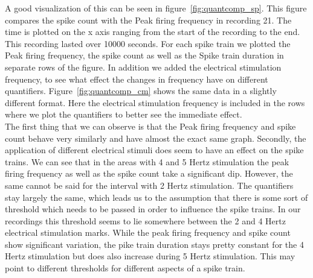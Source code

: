 A good visualization of this can be seen in figure~\ref{fig:quantcomp_sp}. This figure compares the spike count with the Peak firing frequency in recording 21. The time is plotted on the x axis ranging from the start of the recording to the end. This recording lasted over 10000 seconds. For each spike train we plotted the Peak firing frequency, the spike count as well as the Spike train duration in separate rows of the figure. In addition we added the electrical stimulation frequency, to see what effect the changes in frequency have on different quantifiers. Figure~\ref{fig:quantcomp_cm} shows the same data in a slightly different format. Here the electrical stimulation frequency is included in the rows where we plot the quantifiers to better see the immediate effect.\\
The first thing that we can observe is that the Peak firing frequency and spike count behave very similarly and have almost the exact same graph. Secondly, the application of different electrical stimuli does seem to have an effect on the spike trains. We can see that in the areas with 4 and 5 Hertz stimulation the peak firing frequency as well as the spike count take a significant dip. However, the same cannot be said for the interval with 2 Hertz stimulation. The quantifiers stay largely the same, which leads us to the assumption that there is some sort of threshold which needs to be passed in order to influence the spike trains. In our recordings this threshold seems to lie somewhere between the 2 and 4 Hertz electrical stimulation marks.
While the peak firing frequency and spike count show significant variation, the pike train duration stays pretty constant for the 4 Hertz stimulation but does also increase during 5 Hertz stimulation. This may point to different thresholds for different aspects of a spike train.

